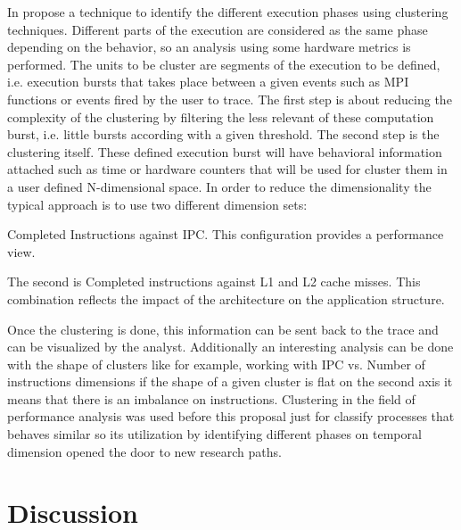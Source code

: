 In \cite{gonzalez2013application} propose a
technique to identify the different execution phases using clustering 
techniques. Different parts of the
execution are considered as the same phase depending on the behavior,
so an analysis using some hardware metrics is
performed. The units to be cluster are segments of the execution to be defined,
i.e. execution bursts that takes place between a given events such as MPI
functions or events fired by the user to trace. The first step is about reducing 
the complexity of the clustering by filtering the less relevant of these 
computation burst, i.e. little bursts according with a given threshold. The 
second step is the clustering itself. These defined execution burst will have
behavioral information attached such as time or hardware counters that will be
used for cluster them in a user defined N-dimensional space. In order to 
reduce the dimensionality the typical approach is to
use two different dimension sets: 
\begin{enumerate*}[label=\roman*)]
  \item  Completed Instructions against IPC. This configuration provides a
        performance view. 
  \item  The second is Completed instructions against L1 and L2 cache
        misses. This combination reflects the impact of the architecture on the
        application structure. 
\end{enumerate*}
Once the clustering is done, this information
can be sent back to the trace and can be visualized by the analyst. Additionally
an interesting analysis can be done with the shape of clusters like for example,
working with IPC vs. Number of instructions dimensions if the shape of a given 
cluster is
flat on the second axis it means that there is an imbalance on instructions.
Clustering in the field of performance analysis was used before this proposal 
just for classify processes that behaves similar so its utilization by
identifying different phases on temporal dimension opened the door to new research
paths.

\section{Discussion}\label{s:soa_discussion}

